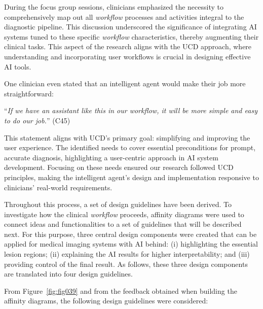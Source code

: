 \textcolor{revised}{During the focus group sessions, clinicians emphasized the necessity to comprehensively map out all {\it workflow} processes and activities integral to the diagnostic pipeline.
This discussion underscored the significance of integrating \ac{AI} systems tuned to these specific {\it workflow} characteristics, thereby augmenting their clinical tasks.
This aspect of the research aligns with the \ac{UCD} approach, where understanding and incorporating user workflows is crucial in designing effective \ac{AI} tools.}

\vspace{1.50mm}

\noindent
One clinician even stated that an intelligent agent would make their job more straightforward:

\vspace{2.50mm}

\noindent
``{\it If we have an assistant like this in our workflow, it will be more simple and easy to do our job.}'' (C45)

\vspace{1.50mm}

\textcolor{revised}{This statement aligns with \acs{UCD}'s primary goal: simplifying and improving the user experience.
The identified needs to cover essential preconditions for prompt, accurate diagnosis, highlighting a user-centric approach in \ac{AI} system development.
Focusing on these needs ensured our research followed \ac{UCD} principles, making the intelligent agent's design and implementation responsive to clinicians' real-world requirements.}

Throughout this process, a set of design guidelines have been derived.
To investigate how the clinical {\it workflow} proceeds, affinity diagrams were used to connect ideas and functionalities to a set of guidelines that will be described next.
For this purpose, three central design components were created that can be applied for medical imaging systems with \ac{AI} behind:
(i) highlighting the essential lesion regions;
(ii) explaining the \ac{AI} results for higher interpretability; and
(iii) providing control of the final result.
As follows, these three design components are translated into four design guidelines.

\vspace{2.00mm}

\noindent
From Figure~\ref{fig:fig039} and from the feedback obtained when building the affinity diagrams, the following design guidelines were considered:

